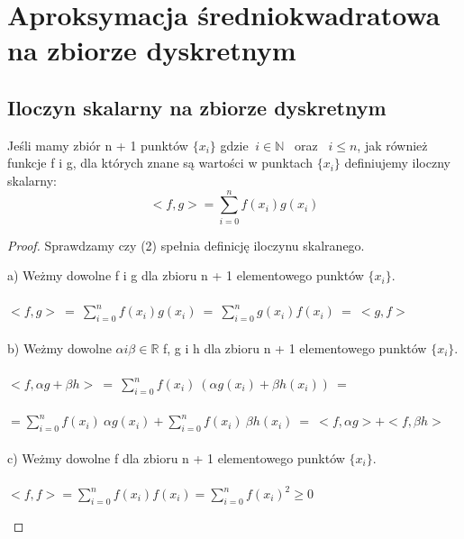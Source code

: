 \documentclass{article}
\begin{document}
\section{Aproksymacja średniokwadratowa na zbiorze dyskretnym}
\subsection{Iloczyn skalarny na zbiorze dyskretnym}
Jeśli mamy zbiór n + 1 punktów $\{ x_{i} \} $ gdzie $\ i \in \mathbb{N}$ \ oraz \ $ i \leq n$, jak również funkcje f i g, dla których znane są wartości w punktach $\{x_{i}\}$ definiujemy iloczny skalarny:
\begin{equation}
    < f,g > = \sum_{i=0}^{n}f(x_{i})g(x_{i})
\end{equation}

\begin{proof}
Sprawdzamy czy (2) spełnia definicję iloczynu skalranego.\\
\begin{tabbing}
\quad a)  Weżmy dowolne f i g dla zbioru n + 1 elementowego punktów $\{ x_{i} \}$. \\ \\
\qquad $< f,g > \ = \ \sum_{i=0}^{n}f(x_{i})g(x_{i}) \ = \ \sum_{i=0}^{n}g(x_{i})f(x_{i}) \ = \ < g,f >$\\\\
\quad b)  Weżmy dowolne $\alpha i \beta \in \mathbb{R}$ f, g i h dla zbioru n + 1 elementowego punktów $\{ x_{i} \}$. \\ \\
\qquad  $<f, \alpha g + \beta h> \  = \ \sum_{i=0}^{n}f(x_{i}) \ (\alpha g(x_{i}) + \beta h(x_{i})) \ =$ \\ \\ 
\qquad $= \sum_{i=0}^{n}f(x_{i}) \ \alpha g(x_{i}) + \sum_{i=0}^{n}f(x_{i}) \ \beta h(x_{i}) \ = \ <f, \alpha g> + <f, \beta h>$\\ \\ 
\quad c)  Weżmy dowolne f dla zbioru n + 1 elementowego punktów $\{ x_{i} \}$. \\ \\
\qquad $ <f,f> = \sum_{i=0}^{n}f(x_{i})f(x_{i}) = \sum_{i=0}^{n}f(x_{i})^{2} \geq 0$
\end{tabbing}
\end{proof}
\end{document}
